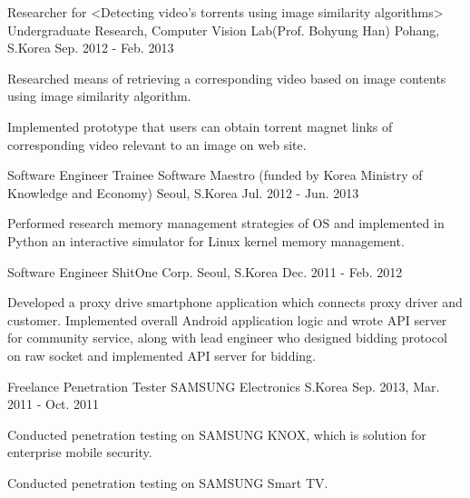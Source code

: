 \begin{cventries}
  \cventry
  {Researcher for <Detecting video’s torrents using image similarity algorithms>} %
  {Undergraduate Research, Computer Vision Lab(Prof. Bohyung Han)} %
  {Pohang, S.Korea} %
  {Sep. 2012 - Feb. 2013} %
  {
    \begin{cvitems} %
    \item {Researched means of retrieving a corresponding video based on image contents using image
      similarity algorithm.}
    \item {Implemented prototype that users can obtain torrent magnet links of corresponding video relevant
      to an image on web site.}
    \end{cvitems}
  }

  \cventry
  {Software Engineer Trainee} %
  {Software Maestro (funded by Korea Ministry of Knowledge and Economy)} %
  {Seoul, S.Korea} %
  {Jul. 2012 - Jun. 2013} %
  {
    \begin{cvitems} %
    \item {Performed research memory management strategies of OS and implemented in Python an interactive
      simulator for Linux kernel memory management.}
    \end{cvitems}
  }

  \cventry
  {Software Engineer} %
  {ShitOne Corp.} %
  {Seoul, S.Korea} %
  {Dec. 2011 - Feb. 2012} %
  {
    \begin{cvitems} %
    \item {Developed a proxy drive smartphone application which connects proxy driver and customer.
        Implemented overall Android application logic and wrote API server for community service, along with
      lead engineer who designed bidding protocol on raw socket and implemented API server for bidding.}
    \end{cvitems}
  }

  \cventry
  {Freelance Penetration Tester} %
  {SAMSUNG Electronics} %
  {S.Korea} %
  {Sep. 2013, Mar. 2011 - Oct. 2011} %
  {
    \begin{cvitems} %
    \item {Conducted penetration testing on SAMSUNG KNOX, which is solution for enterprise mobile security.}
    \item {Conducted penetration testing on SAMSUNG Smart TV.}
    \end{cvitems}
  }

\end{cventries}
